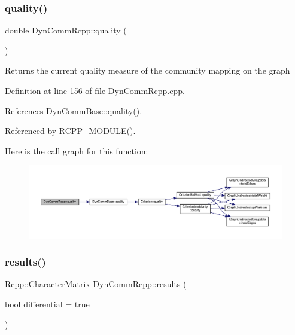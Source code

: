 \subsubsection{\texorpdfstring{quality()}{quality()}}
{\footnotesize\ttfamily double Dyn\+Comm\+Rcpp\+::quality (\begin{DoxyParamCaption}{ }\end{DoxyParamCaption})\hspace{0.3cm}{\ttfamily [inline]}}

\begin{DoxyReturn}{Returns}
the current quality measure of the community mapping on the graph 
\end{DoxyReturn}


Definition at line 156 of file Dyn\+Comm\+Rcpp.\+cpp.



References Dyn\+Comm\+Base\+::quality().



Referenced by R\+C\+P\+P\+\_\+\+M\+O\+D\+U\+L\+E().

Here is the call graph for this function\+:
\nopagebreak
\begin{figure}[H]
\begin{center}
\leavevmode
\includegraphics[width=350pt]{classDynCommRcpp_a3d9d6845d9e67941da187bca511cdfcf_cgraph}
\end{center}
\end{figure}
\mbox{\label{classDynCommRcpp_a4120d9f0232611e4ecb497eaf6e4706a}} 
\subsubsection{\texorpdfstring{results()}{results()}}
{\footnotesize\ttfamily Rcpp\+::\+Character\+Matrix Dyn\+Comm\+Rcpp\+::results (\begin{DoxyParamCaption}\item[{bool}]{differential = {\ttfamily true} }\end{DoxyParamCaption})\hspace{0.3cm}{\ttfamily [inline]}}



